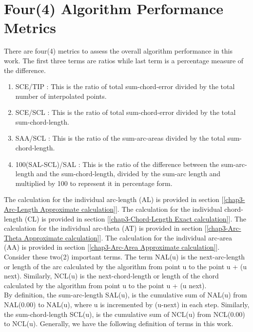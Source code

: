 \section{Four(4) Algorithm Performance Metrics}

\noindent
There are four(4) metrics to assess the overall algorithm performance in this work. The first three terms are ratios while last term is
a percentage measure of the difference.

\begin{enumerate}
	\item SCE/TIP : This is the ratio of total sum-chord-error divided by the total number of interpolated points.  
	\item SCE/SCL : This is the ratio of total sum-chord-error divided by the total sum-chord-length.
	\item SAA/SCL : This is the ratio of the sum-arc-areas divided by the total sum-chord-length.
	\item 100(SAL-SCL)/SAL : This is the ratio of the difference between the sum-arc-length and the sum-chord-length, divided by the sum-arc	length and multiplied by 100 to represent it in percentage form. 
\end{enumerate} 

The calculation for the individual arc-length (AL) is provided in section [\ref{chap3-Arc-Length Approximate calculation}]. The calculation for the individual chord-length (CL) is provided in section [\ref{chap3-Chord-Length Exact calculation}]. The calculation for the individual arc-theta (AT) is provided in section [\ref{chap3-Arc-Theta Approximate calculation}]. The calculation for the individual arc-area (AA) is provided in section [\ref{chap3-Arc-Area Approximate calculation}]. \\

Consider these two(2) important terms. The term NAL(u) is the next-arc-length or length of the arc calculated by the algorithm from point u to the point u + (u next). Similarly, NCL(u) is the next-chord-length or length of the chord calculated by the algorithm from point u to the point u + (u next).\\

By definition, the sum-arc-length SAL(u), is the cumulative sum of NAL(u) from NAL(0.00) to NAL(u), where u is incremented by (u-next) in each step. Similarly, the sum-chord-length SCL(u), is the cumulative sum of NCL(u) from NCL(0.00) to NCL(u). Generally, we have the following definition of terms in this work.

